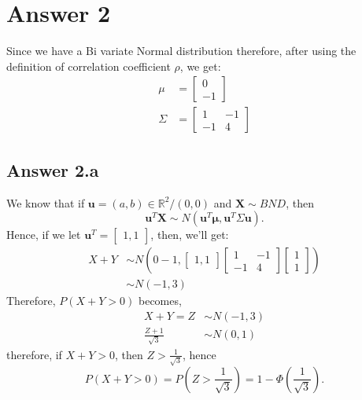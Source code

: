 \documentclass[a4paper]{article}
\begin{document}
 \section{Answer 2}
 Since we have a Bi variate Normal distribution therefore, after using the definition of correlation coefficient  $\rho$, we get:
 \begin{equation*}
 	\begin{split}
 		\mu &= \begin{bmatrix} 0\\-1 \end{bmatrix}\\
		\Sigma &=  \begin{bmatrix} 1&-1\\-1&4 \end{bmatrix}  
	\end{split}
 \end{equation*}
 \subsection{Answer 2.a}
 We know that if $\mathbf{u} = \left( a,b \right) \in \mathbb{R}^{2}/ \left( 0,0 \right)$ and $\mathbf{X} \sim BND$, then
\[	
	\mathbf{u}^{T}\mathbf{X} \sim N\left( \mathbf{u}^{T}\mathbf{\mu}, \mathbf{u}^{T}\Sigma\mathbf{u} \right) 
.\] 
Hence, if we let $\mathbf{u}^{T} = \begin{bmatrix} 1,1 \end{bmatrix} $, then, we'll get:
\begin{equation*}
	\begin{split}
		X + Y &\sim N\left( 0-1, \begin{bmatrix} 1,1 \end{bmatrix} \begin{bmatrix} 1&-1\\-1&4 \end{bmatrix} \begin{bmatrix} 1\\1 \end{bmatrix}  \right)\\
		&\sim N\left( -1,3 \right) 
	\end{split}
\end{equation*}
Therefore, $P\left( X+Y > 0 \right) $ becomes,
\begin{equation*}
	\begin{split}
		X+Y = Z&\sim N\left( -1,3 \right) \\
		\frac{Z+1}{\sqrt{3} }&\sim N\left( 0,1 \right) 
	\end{split}
\end{equation*}	
therefore, if $X+Y > 0$, then  $Z > \frac{1}{\sqrt{3} }$, hence
\[
P\left( X+Y>0 \right) = P\left( Z > \frac{1}{\sqrt{3} } \right) = 1-\Phi\left( \frac{1}{\sqrt{3} } \right) 
.\]
\end{document}
